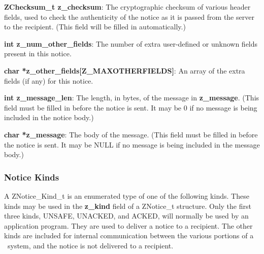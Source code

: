 \begin{description}
\item {\bf ZChecksum_t z_checksum}: The cryptographic checksum of
various header fields, used to check the authenticity of the notice as
it is passed from the server to the recipient.  (This field will be
filled in automatically.)

\item {\bf int z_num_other_fields}: The number of extra user-defined or
unknown fields present in this notice.

\item {\bf char *z_other_fields[Z_MAXOTHERFIELDS]}: An array of the
extra fields (if any) for this notice.

\item {\bf int z_message_len}: The length, in bytes, of the message in
{\bf z_message}.  (This field must be filled in before the notice is
sent.  It may be 0 if no message is being included in the notice body.)

\item {\bf char *z_message}: The body of the message.  (This field must be
filled in before the notice is sent.  It may be NULL if no message is
being included in the message body.)

\end{description}

\subsubsection{Notice Kinds}
\label{notice-kinds}

A ZNotice_Kind_t is an enumerated type of one of the following kinds.
These kinds may be used in the {\bf z_kind} field of a ZNotice_t
structure.  Only the first three kinds, UNSAFE, UNACKED, and ACKED,
will normally be used by an application program.  They are used to
deliver a notice to a recipient.  The other kinds are included for
internal communication between the various portions of a \Zephyr\
system, and the notice is not delivered to a recipient.

